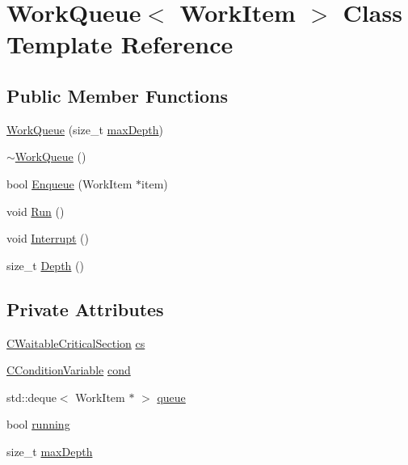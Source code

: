 \hypertarget{class_work_queue}{}\section{Work\+Queue$<$ Work\+Item $>$ Class Template Reference}
\label{class_work_queue}
\subsection*{Public Member Functions}
\begin{DoxyCompactItemize}
\item 
\mbox{\hyperlink{class_work_queue_ab67687ddb3c0358ca21d1abf0a259bcc}{Work\+Queue}} (size\+\_\+t \mbox{\hyperlink{class_work_queue_a9be06784f8d48f7d20bed3ffef363824}{max\+Depth}})
\item 
\mbox{\hyperlink{class_work_queue_a99827207d576d64a2d48ab26544fa99e}{$\sim$\+Work\+Queue}} ()
\item 
bool \mbox{\hyperlink{class_work_queue_a1367fb4c1a883108ecd2a44569646920}{Enqueue}} (Work\+Item $\ast$item)
\item 
void \mbox{\hyperlink{class_work_queue_a762b775b6ec11e2f8351ad79fd6782ba}{Run}} ()
\item 
void \mbox{\hyperlink{class_work_queue_aaf31577d0f8e5ebd2f153928da45b9b9}{Interrupt}} ()
\item 
size\+\_\+t \mbox{\hyperlink{class_work_queue_a03ea7a5a3add5d6e031eb3605d833049}{Depth}} ()
\end{DoxyCompactItemize}
\subsection*{Private Attributes}
\begin{DoxyCompactItemize}
\item 
\mbox{\hyperlink{sync_8h_a341e0aa38106c4dbcedbba878dceb1a5}{C\+Waitable\+Critical\+Section}} \mbox{\hyperlink{class_work_queue_a57782013276daff0989bca48ebb454db}{cs}}
\item 
\mbox{\hyperlink{sync_8h_acdd2020d08e99abd9504ea67d0190520}{C\+Condition\+Variable}} \mbox{\hyperlink{class_work_queue_aa95952abd888d36878b352dbce9e26c6}{cond}}
\item 
std\+::deque$<$ Work\+Item $\ast$ $>$ \mbox{\hyperlink{class_work_queue_a73a474d4e815d2c4741004a935bc28f6}{queue}}
\item 
bool \mbox{\hyperlink{class_work_queue_a54f7b8e284f663a4b25c82bae0434eb9}{running}}
\item 
size\+\_\+t \mbox{\hyperlink{class_work_queue_a9be06784f8d48f7d20bed3ffef363824}{max\+Depth}}
\end{DoxyCompactItemize}


